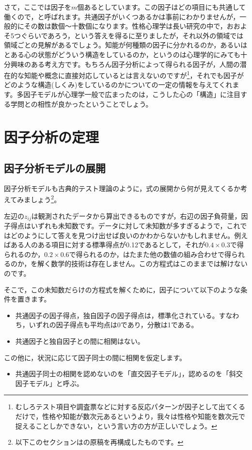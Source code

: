 \documentclass{ltjsbook}
\begin{document}
さて，ここでは因子を$m$個あるとしています。この因子はどの項目にも共通して働くので，と呼ばれます。共通因子がいくつあるかは事前にわかりませんが，一般的にその数は数個〜十数個になります。性格心理学は長い研究の中で，おおよそ5つぐらいであろう，という答えを得るに至りましたが，それ以外の領域では領域ごとの見解があるでしょう。知能が何種類の因子に分かれるのか，あるいはとある心の状態がどういう構造をしているのか，というのは心理学的にみても十分興味のある考え方です。もちろん因子分析によって得られる因子が，人間の潜在的な知能や概念に直接対応しているとは言えないのですが\footnote{むしろテスト項目や調査票などに対する反応パターンが因子として出てくるだけで，性格や知能が数次元あるというより，我々は性格や知能を数次元で捉えることしかできない，という言い方の方が正しいでしょう。}，それでも因子がどのような構造(しくみ)をしているのかについての一定の情報を与えてくれます。多因子モデルが心理学一般で広まったのは，こうした心の「構造」に注目する学問との相性が良かったということでしょう。

\section{因子分析の定理}
\subsection{因子分析モデルの展開}
因子分析モデルも古典的テスト理論のように，式の展開から何が見えてくるか考えてみましょう\footnote{以下このセクションは\citet{kosugi2018}の原稿を再構成したものです。}。

左辺の$z_{ij}$は観測されたデータから算出できるものですが，右辺の因子負荷量，因子得点はいずれも未知数です。データに対して未知数が多すぎるようで，これではどのようにして答えを見つけ出せば良いのかわからないかもしれません。例えばある人のある項目に対する標準得点が0.12であるとして，それが$0.4 \times 0.3$で得られるのか，$0.2 \times 0.6$で得られるのか，はたまた他の数値の組み合わせで得られるのか，を解く数学的技術は存在しません。この方程式はこのままでは解けないのです。

そこで，この未知数だらけの方程式を解くために，因子について以下のような条件を置きます。
\begin{itemize}
	\item 共通因子の因子得点，独自因子の因子得点は，標準化されている。すなわち，いずれの因子得点も平均点は0であり，分散は1である。
	\item 共通因子と独自因子との間に相関はない。
\end{itemize}
この他に，状況に応じて因子同士の間に相関を仮定します。
\begin{itemize}
	\item 共通因子同士の相関を認めないのを「直交因子モデル」，認めるのを「斜交因子モデル」と呼ぶ。
\end{itemize}
\end{document}
